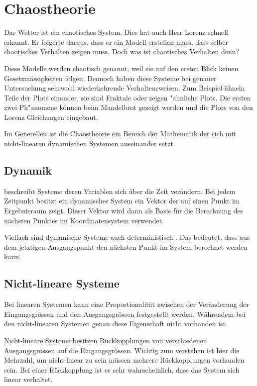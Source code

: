 
\section{Chaostheorie}
Das Wetter ist ein chaotisches System. Dies hat auch Herr Lorenz schnell erkannt. Er folgerte daraus, dass er ein Modell erstellen muss, dass selber chaotisches Verhalten zeigen muss. Doch was ist chaotisches Verhalten denn?

Diese Modelle werden chaotisch genannt, weil sie auf den ersten Blick keinen Gesetzmässigkeiten folgen. Dennoch haben diese Systeme bei genauer Untersuchung sehrwohl wiederkehrende Verhaltensweisen. Zum Beispiel ähneln Teile der Plots einander, sie sind Fraktale oder zeigen "ahnliche Plots. Die ersten zwei Ph"anomene können beim Mandelbrot gezeigt werden \cite{Gleick} und die Plots von den Lorenz Gleichungen eingebaut.

Im Generellen ist die Chaostheorie ein Bereich der Mathematik der sich mit nicht-linearen dynamischen Systemen auseinander setzt.

\subsection{Dynamik} beschreibt Systeme deren Variablen sich über die Zeit verändern. Bei jedem Zeitpunkt besitzt ein dynamisches System ein Vektor der auf einen Punkt im Ergebnisraum zeigt. Dieser Vektor wird dann als Basis für die Berechnung des nächsten Punktes im Koordinatensystem verwendet.

Vielfach sind dynamische Systeme auch deterministisch \cite{wikidynamicalsystems}. Das bedeutet, dass aus dem jetztigen Ausgangspunkt den nächsten Punkt im System berechnet werden kann.


\subsection{Nicht-lineare Systeme} %
Bei linearen Systemen kann eine Proportionalität zwischen der Veränderung der Eingangsgrössen und den Ausgangsgrössen festgestellt werden. Währendem bei den nicht-linearen Systemen genau diese Eigenschaft nicht vorhanden ist.

Nicht-lineare Systeme besitzen Rückkopplungen von verschiedenen Ausgangsgrössen auf die Eingangsgrössen. Wichtig zum verstehen ist hier die Mehrzahl, um nicht-linear zu sein müssen mehrere Rückkopplungen vorhanden sein. Bei einer Rückkopplung ist es sehr wahrscheinlich, dass das System sich linear verhaltet.

